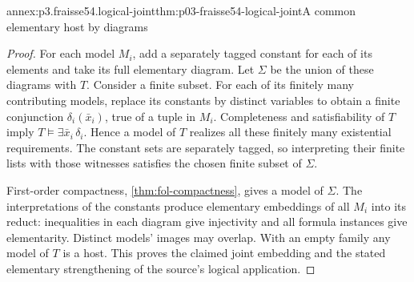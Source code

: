 \begin{annexitem}{annex:p3.fraisse54.logical-joint}{thm:p03-fraisse54-logical-joint}{A common elementary host by diagrams}
\begin{proof}
For each model \(M_i\), add a separately tagged constant for each of its
elements and take its full elementary diagram. Let \(\Sigma\) be the
union of these diagrams with \(T\). Consider a finite subset. For each
of its finitely many contributing models, replace its constants by distinct
variables to obtain a finite conjunction \(\delta_i(\bar x_i)\), true
of a tuple in \(M_i\). Completeness and satisfiability of \(T\) imply
\(T\models\exists\bar x_i\,\delta_i\). Hence a model of \(T\)
realizes all these finitely many existential requirements. The constant
sets are separately tagged, so interpreting their finite lists with those
witnesses satisfies the chosen finite subset of \(\Sigma\).

First-order compactness, \cref{thm:fol-compactness}, gives a model
of \(\Sigma\). The interpretations of the constants produce elementary
embeddings of all \(M_i\) into its reduct: inequalities in each diagram
give injectivity and all formula instances give elementarity. Distinct
models' images may overlap. With an empty family any model of \(T\)
is a host. This proves the claimed joint embedding and the stated
elementary strengthening of the source's logical application.
\end{proof}
\end{annexitem}
